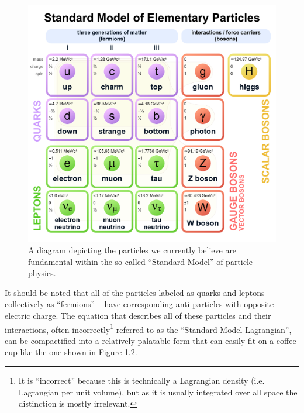 \begin{figure}
    \centering
    \includegraphics[scale=0.2]{figures/StandardModel.png}
    \caption{A diagram depicting the particles we currently believe are fundamental within the so-called ``Standard Model'' of particle physics.}
    \label{fig:my_label}
\end{figure}
 It should be noted that all of the particles labeled as quarks and leptons -- collectively as ``fermions'' -- have corresponding anti-particles with opposite electric charge.
The equation that describes all of these particles and their interactions, often incorrectly\footnote[1]{It is ``incorrect'' because this is technically a Lagrangian density (i.e. Lagrangian per unit volume), but as it is usually integrated over all space the distinction is mostly irrelevant.} referred to as the ``Standard Model Lagrangian'', can be compactified into a relatively palatable form that can easily fit on a coffee cup like the one shown in Figure 1.2.
